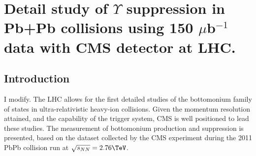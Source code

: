 \chapter{Detail study of $\Upsilon$ suppression in Pb+Pb collisions using 150 $\mu$b$^{-1}$ data with CMS detector at LHC.} 
\label{chap:UpsilonProductionPbPb2011}

\section{Introduction}
\label{sec:introduction}
I modify.
The LHC allows for the first detailed studies of the bottomonium family of states in ultra-relativistic 
heavy-ion collisions. Given the momentum resolution attained, and the capability of the trigger system,  
CMS is well positioned to lead these studies. The measurement of bottomonium production and suppression is 
presented, based on the dataset collected by the CMS experiment during the 2011 PbPb collision run at  $\sqrtsnn = 2.76\TeV$. 

